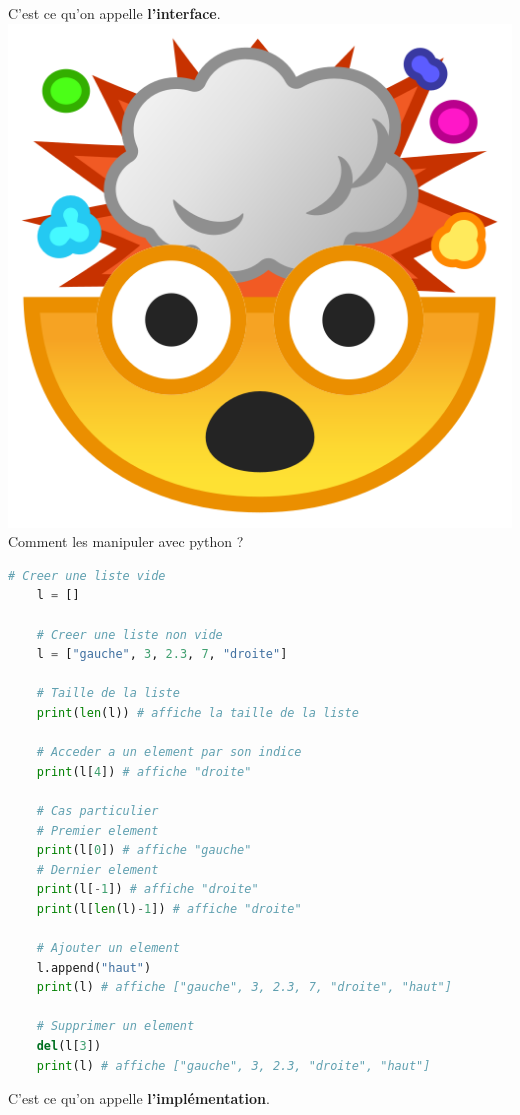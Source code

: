 C'est ce qu'on appelle \textbf{l'interface}.\\

\includegraphics[scale=0.03]{Common_blob/mindblow.png}{\selectfont
Comment les manipuler avec python ?\\
}
\begin{lstlisting}[language=Python]
    # Creer une liste vide 
    l = []

    # Creer une liste non vide
    l = ["gauche", 3, 2.3, 7, "droite"]

    # Taille de la liste
    print(len(l)) # affiche la taille de la liste

    # Acceder a un element par son indice
    print(l[4]) # affiche "droite"

    # Cas particulier
    # Premier element
    print(l[0]) # affiche "gauche"
    # Dernier element 
    print(l[-1]) # affiche "droite"
    print(l[len(l)-1]) # affiche "droite"

    # Ajouter un element
    l.append("haut")
    print(l) # affiche ["gauche", 3, 2.3, 7, "droite", "haut"]

    # Supprimer un element
    del(l[3])
    print(l) # affiche ["gauche", 3, 2.3, "droite", "haut"]
\end{lstlisting}

C'est ce qu'on appelle \textbf{l'implémentation}.\\

